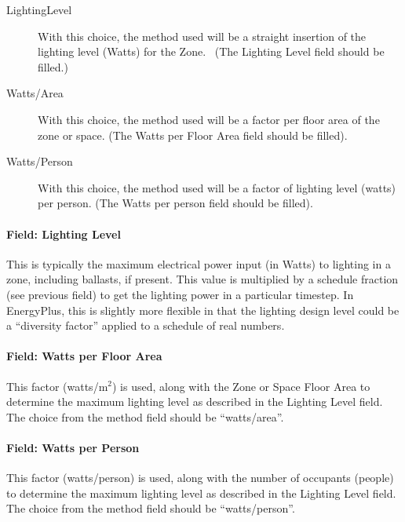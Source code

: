 \begin{description}

\item[LightingLevel] With this choice, the method used will be a straight insertion of the lighting level (Watts) for the Zone.~ (The Lighting Level field should be filled.)

\item[Watts/Area] With this choice, the method used will be a factor per floor area of the zone or space. (The Watts per Floor Area field should be filled).

\item[Watts/Person] With this choice, the method used will be a factor of lighting level (watts) per person. (The Watts per person field should be filled).

\end{description}

\paragraph{Field: Lighting Level}\label{field-lighting-level}

This is typically the maximum electrical power input (in Watts) to lighting in a zone, including ballasts, if present. This value is multiplied by a schedule fraction (see previous field) to get the lighting power in a particular timestep. In EnergyPlus, this is slightly more flexible in that the lighting design level could be a ``diversity factor'' applied to a schedule of real numbers.

\paragraph{Field: Watts per Floor Area}\label{field-watts-per-zone-floor-area}

This factor (watts/m\(^{2}\)) is used, along with the Zone or Space Floor Area to determine the maximum lighting level as described in the Lighting Level field. The choice from the method field should be ``watts/area''.

\paragraph{Field: Watts per Person}\label{field-watts-per-person}

This factor (watts/person) is used, along with the number of occupants (people) to determine the maximum lighting level as described in the Lighting Level field. The choice from the method field should be ``watts/person''.

